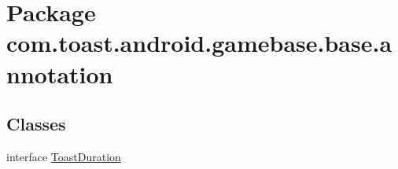 \hypertarget{namespacecom_1_1toast_1_1android_1_1gamebase_1_1base_1_1annotation}{}\section{Package com.\+toast.\+android.\+gamebase.\+base.\+annotation}
\label{namespacecom_1_1toast_1_1android_1_1gamebase_1_1base_1_1annotation}
\subsection*{Classes}
\begin{DoxyCompactItemize}
\item 
interface \hyperlink{interfacecom_1_1toast_1_1android_1_1gamebase_1_1base_1_1annotation_1_1_toast_duration}{Toast\+Duration}
\end{DoxyCompactItemize}
